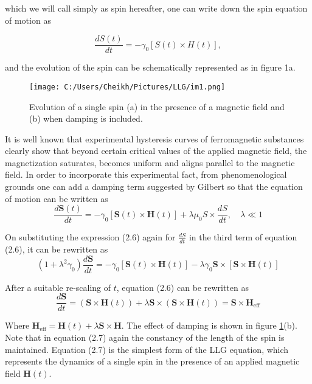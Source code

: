\documentclass{article}
\begin{document}
	which we will call simply as spin hereafter, one can write down the spin equation of motion as
	
	\begin{equation}
	\frac{dS(t)}{dt} = -\gamma_0 [S(t) \times H(t)],
	\end{equation}
	
	and the evolution of the spin can be schematically represented as in figure 1a.
	
	\begin{figure}[htbp]
		\centering
		\texttt{[image: C:/Users/Cheikh/Pictures/LLG/im1.png]}
		\caption{Evolution of a single spin (a) in the presence of a magnetic field and (b) when damping is included.}
		\label{fig:spin_evolution}
	\end{figure}
	
	It is well known that experimental hysteresis curves of ferromagnetic substances clearly show that beyond certain critical values of the applied magnetic field, the magnetization saturates, becomes uniform and aligns parallel to the magnetic field. In order to incorporate this experimental fact, from phenomenological grounds one can add a damping term suggested by Gilbert \cite{gilbert} so that the equation of motion can be written as
	\begin{equation}
	\frac{d\mathbf{S}(t)}{dt} = -\gamma_0[\mathbf{S}(t) \times \mathbf{H}(t)] + \lambda\mu_0 S \times \frac{dS}{dt}, \quad \lambda \ll 1
	\end{equation}
	
	On substituting the expression (2.6) again for $\frac{dS}{dt}$ in the third term of equation (2.6), it can be rewritten as
	\begin{equation}
	(1+\lambda^2\gamma_0)\frac{d\mathbf{S}}{dt} = -\gamma_0[\mathbf{S}(t) \times \mathbf{H}(t)] - \lambda \gamma_0 \mathbf{S} \times [\mathbf{S} \times \mathbf{H}(t)]
	\end{equation}
	
	After a suitable re-scaling of $t$, equation (2.6) can be rewritten as
	\begin{equation}
	\frac{d\mathbf{S}}{dt} = (\mathbf{S} \times \mathbf{H}(t)) + \lambda \mathbf{S} \times (\mathbf{S} \times \mathbf{H}(t)) = \mathbf{S} \times \mathbf{H}_{\text{eff}}
	\end{equation}
	
	Where $\mathbf{H}_{\text{eff}} = \mathbf{H}(t) + \lambda \mathbf{S} \times \mathbf{H}$. The effect of damping is shown in figure \ref{fig:spin_evolution}(b). Note that in equation (2.7) again the constancy of the length of the spin is maintained. Equation (2.7) is the simplest form of the LLG equation, which represents the dynamics of a single spin in the presence of an applied magnetic field $\mathbf{H}(t)$.
	
\end{document}
